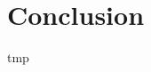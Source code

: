 \documentclass[12pt]{article}
\begin{document}
\section{Conclusion}
tmp



\newpage


\end{document}
